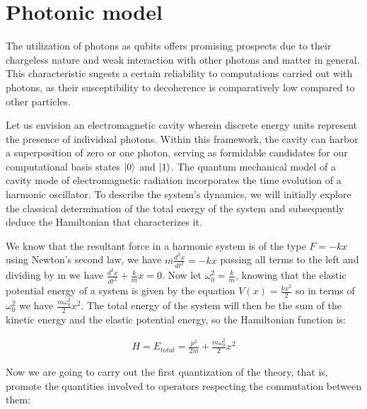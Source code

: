 \documentclass[
  journal=largetwo,
  year=2023,
]{cup-journal}
\begin{document}

\section{Photonic model}
\label{cap:photonic}
The utilization of photons as qubits offers promising prospects due to their chargeless nature and weak interaction with other photons and matter in general. This characteristic sugests a certain reliability to computations carried out with photons, as their susceptibility to decoherence is comparatively low compared to other particles.

Let us envision an electromagnetic cavity wherein discrete energy units represent the presence of individual photons. Within this framework, the cavity can harbor a superposition of zero or one photon, serving as formidable candidates for our computational basis states \(\ket{0}\) and \(\ket{1}\). The quantum mechanical model of a cavity mode of electromagnetic radiation incorporates the time evolution of a harmonic oscillator. To describe the system's dynamics, we will initially explore the classical determination of the total energy of the system and subsequently deduce the Hamiltonian that characterizes it.


We know that the resultant force in a harmonic system is of the type \(F = -kx\) using Newton's second law, we have \(m\frac{d^2x}{dt^2} = -kx\) passing all terms to the left and dividing by m we have \(\frac{d^2x}{dt^2} + \frac{k}{m}x = 0\). Now let \(\omega_0^{2} = \frac{k}{m}\), knowing that the elastic potential energy of a system is given by the equation \(V(x) = \frac{kx^2}{2}\) so in terms of \(\omega_0^{2}\) we have \(\frac{m\omega_0^{2}}{2}x^2\). The total energy of the system will then be the sum of the kinetic energy and the elastic potential energy, so the Hamiltonian function is:

\begin{equation}
  \begin{aligned}\label{eq:8}
    H = E_{total} = \frac{p^2}{2m} + \frac{m\omega_0^{2}}{2}x^2
  \end{aligned}
\end{equation}


Now we are going to carry out the first quantization of the theory, that is, promote the quantities involved to operators respecting the commutation between them:
\end{document}
